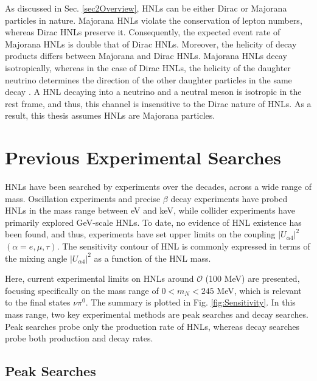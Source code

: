 As discussed in Sec. \ref{sec2Overview}, HNLs can be either Dirac or Majorana particles in nature.
Majorana HNLs violate the conservation of lepton numbers, whereas Dirac HNLs preserve it.
Consequently, the expected event rate of Majorana HNLs is double that of Dirac HNLs.
Moreover, the helicity of decay products differs between Majorana and Dirac HNLs.
Majorana HNLs decay isotropically, whereas in the case of Dirac HNLs, the helicity of the daughter neutrino determines the direction of the other daughter particles in the same decay \cite{HNLSilvia}.
A HNL decaying into a neutrino and a neutral meson is isotropic in the rest frame, and thus, this channel is insensitive to the Dirac nature of HNLs.
As a result, this thesis assumes HNLs are Majorana particles.

\section{Previous Experimental Searches}
\label{sec2Previous}


HNLs have been searched by experiments over the decades, across a wide range of mass.
Oscillation experiments and precise $\beta$ decay experiments have probed HNLs in the mass range between eV and keV, while collider experiments have primarily explored GeV-scale HNLs.
To date, no evidence of HNL existence has been found, and thus, experiments have set upper limits on the coupling $|U_{\alpha4}|^{2}$ $(\alpha=e,\mu,\tau)$.
The sensitivity contour of HNL is commonly expressed in terms of the mixing angle $|U_{\alpha4}|^{2}$ as a function of the HNL mass.

Here, current experimental limits on HNLs around $\mathcal{O}$ (100 MeV) are presented, focusing specifically on the mass range of $ 0 < m_{N} < 245 $ MeV, which is relevant to the final states $\nu\pi^{0}$.
The summary is plotted in Fig. \ref{fig:Sensitivity}.
In this mass range, two key experimental methods are peak searches and decay searches.
Peak searches probe only the production rate of HNLs, whereas decay searches probe both production and decay rates.


\subsection{Peak Searches}

